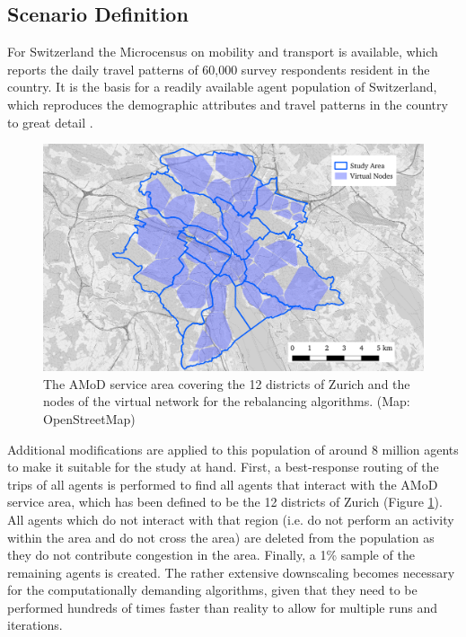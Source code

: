 
\subsection{Scenario Definition}

For Switzerland the Microcensus on mobility and transport \cite{microcensus} is
available, which reports the daily travel patterns of 60,000 survey respondents
resident in the country.
It is the basis for a readily available agent population of
Switzerland, which reproduces the demographic attributes and travel patterns
in the country to great detail \cite{ivtbaseline}.

\begin{figure}[h]
\begin{center}\includegraphics[width=1.0\textwidth]{figures/map.pdf}\end{center}
\caption{The AMoD service area covering the 12 districts of Zurich and the nodes of the
virtual network for the rebalancing algorithms. (Map: OpenStreetMap)}
\label{fig:study_area_vnodes}
\end{figure}

Additional modifications are applied to this population of around 8 million
agents to make it suitable for the study at hand. First, a best-response routing
of the trips of all agents is performed to find all agents that interact
with the AMoD service area, which has been defined to be the 12 districts of Zurich (Figure \ref{fig:study_area_vnodes}).
All agents which do not interact with that region (i.e. do not perform an activity within
the area and do not cross the area) are deleted from the population as they do
not contribute congestion in the area. Finally, a 1\%
sample of the remaining agents is created. The rather extensive downscaling becomes necessary for the computationally
demanding algorithms, given that they need to be performed hundreds of times faster
than reality to allow for multiple runs and iterations.


